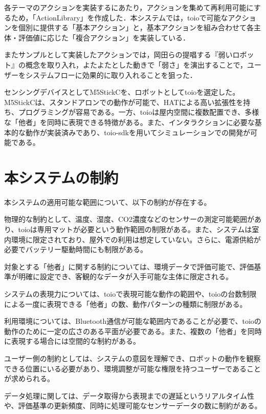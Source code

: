 \documentclass[paper=a4paper,jafontsize=9pt,head_space=15mm,gutter=20mm,
twocolumn,number_of_lines=49, line_length=26zw]{myuarticle}
\begin{document}
各テーマのアクションを実装するにあたり，アクションを集めて再利用可能にするため，「ActionLibrary」を作成した．本システムでは，toioで可能なアクションを個別に提供する「基本アクション」と，基本アクションを組み合わせて各主体・評価値に応じた「複合アクション」を実装している．

またサンプルとして実装したアクションでは，岡田ら\cite{岡田-2017-弱いロボ}の提唱する『弱いロボット』の概念を取り入れ，よたよたとした動きで「弱さ」を演出することで，ユーザーをシステムフローに効果的に取り入れることを狙った．

センシングデバイスとしてM5StickCを、ロボットとしてtoioを選定した。M5StickCは、スタンドアロンでの動作が可能で、HATによる高い拡張性を持ち、プログラミングが容易である。一方、toioは屋内空間に複数配置でき、多様な「他者」を同時に表現できる特徴がある。また、インタラクションに必要な基本的な動作が実装済みであり、toio-sdkを用いてシミュレーションでの開発が可能である。

\section{本システムの制約}

本システムの適用可能な範囲について、以下の制約が存在する。

物理的な制約として、温度、湿度、CO2濃度などのセンサーの測定可能範囲があり、toioは専用マットが必要という動作範囲の制限がある。また、システムは室内環境に限定されており、屋外での利用は想定していない。さらに、電源供給が必要でバッテリー駆動時間にも制限がある。

対象とする「他者」に関する制約については、環境データで評価可能で、評価基準が明確に設定でき、客観的なデータが入手可能な主体に限定される。

システムの表現力については、toioで表現可能な動作の範囲や、toioの台数制限による一度に表現できる「他者」の数、動作パターンの種類に制限がある。

利用環境については、Bluetooth通信が可能な範囲内であることが必要で、toioの動作のために一定の広さのある平面が必要である。また、複数の「他者」を同時に表現する場合には空間的な制約がある。

ユーザー側の制約としては、システムの意図を理解でき、ロボットの動作を観察できる位置にいる必要があり、環境調整が可能な権限を持つユーザーであることが求められる。

データ処理に関しては、データ取得から表現までの遅延というリアルタイム性や、評価基準の更新頻度、同時に処理可能なセンサーデータの数に制約がある。
\end{document}
